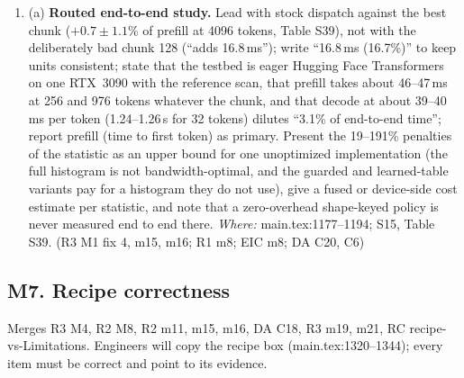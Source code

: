\documentclass[11pt]{article}
\begin{document}
\begin{enumerate}[label=M6\alph*.]
        forward pass'' (mean per-call regret times the number of layers over a
        non-workload-weighted mix) or switch to ms per prefill at stated
        $(L,B)$ points, and give the latency-weighted figure wherever a
        per-call regret appears in the abstract or conclusion. \emph{Where:}
        Sec.~6.7 ``Deployment units'', ``Key churn'', ``Serving traces''
        (1284--1372); Table~8 caption; appendix.tex:2206--2220. (EIC M7; R3
        M1 fix 3; R2 M4.4; R1 m9; R3 m5; R2 m14; DA C6)
  \item (a) \textbf{Routed end-to-end study.} Lead with stock dispatch against
        the best chunk ($+0.7\pm1.1$\% of prefill at 4096 tokens, Table S39),
        not with the deliberately bad chunk 128 (``adds 16.8\,ms''); write
        ``16.8\,ms (16.7\%)'' to keep units consistent; state that the testbed
        is eager Hugging Face Transformers on one RTX~3090 with the reference
        scan, that prefill takes about 46--47\,ms at 256 and 976 tokens
        whatever the chunk, and that decode at about 39--40\,ms per token
        (1.24--1.26\,s for 32 tokens) dilutes ``3.1\% of end-to-end time'';
        report prefill (time to first token) as primary. Present the
        19--191\% penalties of the statistic as an upper bound for one
        unoptimized implementation (the full histogram is not
        bandwidth-optimal, and the guarded and learned-table variants pay for
        a histogram they do not use), give a fused or device-side cost
        estimate per statistic, and note that a zero-overhead shape-keyed
        policy is never measured end to end there. \emph{Where:}
        main.tex:1177--1194; S15, Table S39. (R3 M1 fix 4, m15, m16; R1 m8;
        EIC m8; DA C20, C6)
\end{enumerate}

\subsection*{M7. Recipe correctness}
Merges R3 M4, R2 M8, R2 m11, m15, m16, DA C18, R3 m19, m21, RC
recipe-vs-Limitations. Engineers will copy the recipe box (main.tex:1320--1344);
every item must be correct and point to its evidence.
\end{document}
